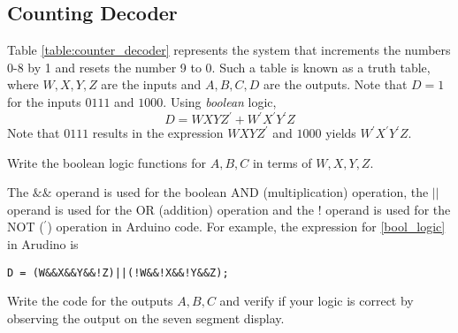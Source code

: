


%
\subsection{Counting Decoder}
%
Table \ref{table:counter_decoder} represents the system that increments the numbers 0-8 by 1 and resets the number 9 to 0. Such a table is known as a truth table, where $W,X,Y,Z$ are the inputs
and $A,B,C,D$ are the outputs. 
Note that  $D = 1$ for the inputs $0111$ and $1000$.  Using {\em boolean} logic,
%
\begin{equation}
\label{bool_logic}
D = WXYZ^{'} + W^{'}X^{'}Y^{'}Z
\end{equation}
%
Note that $0111$ results in the expression $WXYZ^{'}$ and $1000$ yields $W^{'}X^{'}Y^{'}Z$. 
\begin{problem}
	\label{counter_dec}
Write the boolean logic functions for $A,B,C$ in terms of $W,X,Y,Z$.
\end{problem}
		
%

The $\&\&$ operand is used for the boolean AND (multiplication) operation, the $||$ operand is used for the OR (addition) operation and the ! operand is used for the NOT ($^{'}$) operation in Arduino code.  For example, the expression for \eqref{bool_logic} in Arudino is
\begin{verbatim}
D = (W&&X&&Y&&!Z)||(!W&&!X&&!Y&&Z);
\end{verbatim}
%
\begin{problem}
Write the code for the outputs $A,B,C$ and verify if your logic is correct by observing the output on the seven segment display.
\end{problem}
%
